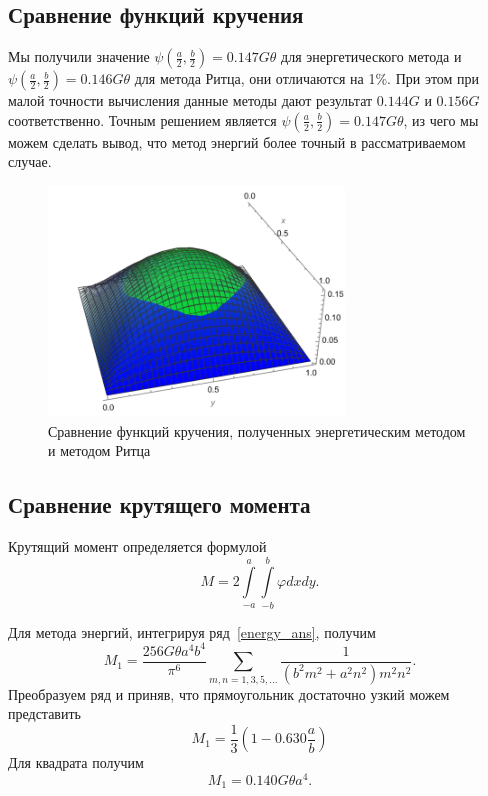 \documentclass[12pt, a4paper]{article}
\begin{document}
\subsection{Сравнение функций кручения}
Мы получили	значение $\psi\left(\frac{a}{2}, \frac{b}{2}\right) = 0.147G\theta$ для энергетического метода и $\psi\left(\frac{a}{2}, \frac{b}{2}\right) = 0.146G\theta$ для метода Ритца, они отличаются на 1\%. При этом при малой точности вычисления данные методы дают результат $0.144G$ и $0.156G$ соответственно. Точным решением является $\psi\left(\frac{a}{2}, \frac{b}{2}\right) = 0.147G\theta$, из чего мы можем сделать вывод, что метод энергий более точный в рассматриваемом случае.
\begin{figure}[!h]
	\centering
	\includegraphics[width=0.7\textwidth]{compare3d}%
	\caption{
		Сравнение функций кручения, полученных энергетическим методом и методом Ритца
	}
	\vspace*{-2mm}
	\label{ritz_graph}
\end{figure}
\newpage
\subsection{Сравнение крутящего момента}
Крутящий момент определяется формулой
\begin{equation}
	\label{torque_com}
	M = 2 \int\limits_{-a}^a \int\limits_{-b}^b \varphi dx dy.
\end{equation}

Для метода энергий, интегрируя ряд~\eqref{energy_ans}, получим
\begin{equation}\label{torque_Miclin}
	M_1 = \frac{256 G \theta a^4 b^4} {\pi^6}\!\!\!\sum_{m, n = 1, 3, 5, \ldots}\!\!\!\frac{1}{(b^2 m^2 + a^2 n^2 )m^2 n^2}.
\end{equation}
Преобразуем ряд и приняв, что прямоугольник достаточно узкий можем представить
\[
M_1=\frac{1}{3}\left(1 - 0.630\frac{a}{b}\right)
\]
Для квадрата получим
\[
M_1=0.140G\theta a^4.
\]
\end{document}
